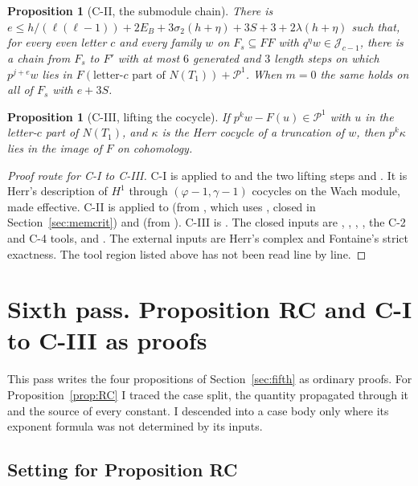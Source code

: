 \documentclass[11pt]{article}
\newcommand{\Pp}{\mathcal P}
\newtheorem{prop}[lemma]{Proposition}
\theoremstyle{definition}
\theoremstyle{remark}
\begin{document}
\begin{prop}[C-II, the submodule chain]\label{prop:CII}
There is $e\le h/(\ell(\ell-1))+2E_B+3\sigma_2(h+\eta)+3S+3+2\lambda(h+\eta)$ such that, for every even letter $c$ and every family $w$ on $F_s\subseteq FF$ with $q^\eta w\in\mathcal J_{c-1}$, there is a chain from $F_s$ to $F'$ with at most $6$ generated and $3$ length steps on which $p^{j+e}w$ lies in $F(\text{letter-}c\text{ part of }N(T_1))+\Pp^1$. When $m=0$ the same holds on all of $F_s$ with $e+3S$.
\end{prop}

\begin{prop}[C-III, lifting the cocycle]\label{prop:CIII}
If $p^kw-F(u)\in\Pp^1$ with $u$ in the letter-$c$ part of $N(T_1)$, and $\kappa$ is the Herr cocycle of a truncation of $w$, then $p^k\kappa$ lies in the image of $F$ on cohomology.
\end{prop}

\begin{proof}[Proof route for C-I to C-III]
C-I is  applied to  and the two lifting steps  and . It is Herr's description of $H^1$ through $(\varphi-1,\gamma-1)$ cocycles on the Wach module, made effective. C-II is  applied to  (from , which uses , closed in Section~\ref{sec:memcrit}) and  (from ). C-III is . The closed inputs are , , , , the C-2 and C-4 tools, and . The external inputs are Herr's complex and Fontaine's strict exactness. The tool region listed above has not been read line by line.
\end{proof}

\section{Sixth pass. Proposition RC and C-I to C-III as proofs}\label{sec:sixth}

This pass writes the four propositions of Section~\ref{sec:fifth} as ordinary proofs. For Proposition~\ref{prop:RC} I traced the case split, the quantity propagated through it and the source of every constant. I descended into a case body only where its exponent formula was not determined by its inputs.

\subsection*{Setting for Proposition RC}
\end{document}
